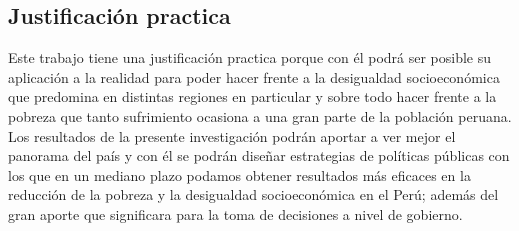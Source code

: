 \subsection{Justificación practica}


Este trabajo tiene una justificación practica porque con él podrá ser posible su aplicación a la realidad para poder hacer frente a la desigualdad socioeconómica que predomina en distintas regiones en particular y sobre todo hacer frente a la pobreza que tanto sufrimiento ocasiona a una gran parte de la población peruana. \\
Los resultados de la presente investigación podrán aportar a ver mejor el panorama del país y con él se podrán diseñar estrategias de políticas públicas con los que en un mediano plazo podamos obtener resultados más eficaces en la reducción de la pobreza y la desigualdad socioeconómica en el Perú; además del gran aporte que significara para la toma de decisiones a nivel de gobierno.




